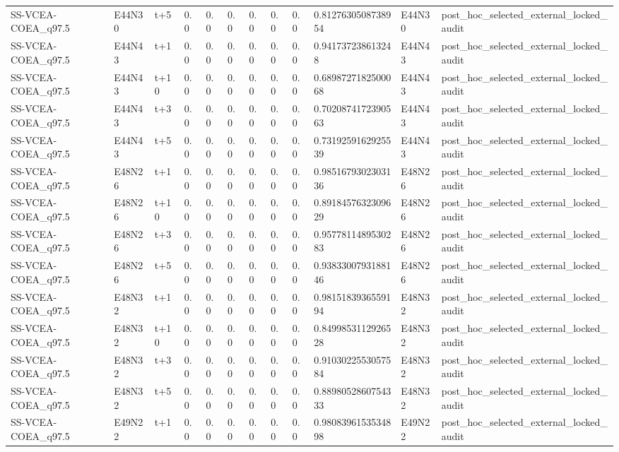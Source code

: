 \begin{landscape}
\begin{longtable}{llllllllllll}
SS-VCEA-COEA\_q97.5 & E44N30 & t+5 & 0.0 & 0.0 & 0.0 & 0.0 & 0.0 & 0.0 & 0.8127630508738954 & E44N30 & post\_hoc\_selected\_external\_locked\_audit \\
SS-VCEA-COEA\_q97.5 & E44N43 & t+1 & 0.0 & 0.0 & 0.0 & 0.0 & 0.0 & 0.0 & 0.941737238613248 & E44N43 & post\_hoc\_selected\_external\_locked\_audit \\
SS-VCEA-COEA\_q97.5 & E44N43 & t+10 & 0.0 & 0.0 & 0.0 & 0.0 & 0.0 & 0.0 & 0.6898727182500068 & E44N43 & post\_hoc\_selected\_external\_locked\_audit \\
SS-VCEA-COEA\_q97.5 & E44N43 & t+3 & 0.0 & 0.0 & 0.0 & 0.0 & 0.0 & 0.0 & 0.7020874172390563 & E44N43 & post\_hoc\_selected\_external\_locked\_audit \\
SS-VCEA-COEA\_q97.5 & E44N43 & t+5 & 0.0 & 0.0 & 0.0 & 0.0 & 0.0 & 0.0 & 0.7319259162925539 & E44N43 & post\_hoc\_selected\_external\_locked\_audit \\
SS-VCEA-COEA\_q97.5 & E48N26 & t+1 & 0.0 & 0.0 & 0.0 & 0.0 & 0.0 & 0.0 & 0.9851679302303136 & E48N26 & post\_hoc\_selected\_external\_locked\_audit \\
SS-VCEA-COEA\_q97.5 & E48N26 & t+10 & 0.0 & 0.0 & 0.0 & 0.0 & 0.0 & 0.0 & 0.8918457632309629 & E48N26 & post\_hoc\_selected\_external\_locked\_audit \\
SS-VCEA-COEA\_q97.5 & E48N26 & t+3 & 0.0 & 0.0 & 0.0 & 0.0 & 0.0 & 0.0 & 0.9577811489530283 & E48N26 & post\_hoc\_selected\_external\_locked\_audit \\
SS-VCEA-COEA\_q97.5 & E48N26 & t+5 & 0.0 & 0.0 & 0.0 & 0.0 & 0.0 & 0.0 & 0.9383300793188146 & E48N26 & post\_hoc\_selected\_external\_locked\_audit \\
SS-VCEA-COEA\_q97.5 & E48N32 & t+1 & 0.0 & 0.0 & 0.0 & 0.0 & 0.0 & 0.0 & 0.9815183936559194 & E48N32 & post\_hoc\_selected\_external\_locked\_audit \\
SS-VCEA-COEA\_q97.5 & E48N32 & t+10 & 0.0 & 0.0 & 0.0 & 0.0 & 0.0 & 0.0 & 0.8499853112926528 & E48N32 & post\_hoc\_selected\_external\_locked\_audit \\
SS-VCEA-COEA\_q97.5 & E48N32 & t+3 & 0.0 & 0.0 & 0.0 & 0.0 & 0.0 & 0.0 & 0.9103022553057584 & E48N32 & post\_hoc\_selected\_external\_locked\_audit \\
SS-VCEA-COEA\_q97.5 & E48N32 & t+5 & 0.0 & 0.0 & 0.0 & 0.0 & 0.0 & 0.0 & 0.8898052860754333 & E48N32 & post\_hoc\_selected\_external\_locked\_audit \\
SS-VCEA-COEA\_q97.5 & E49N22 & t+1 & 0.0 & 0.0 & 0.0 & 0.0 & 0.0 & 0.0 & 0.9808396153534898 & E49N22 & post\_hoc\_selected\_external\_locked\_audit \\

\end{longtable}
\end{landscape}
